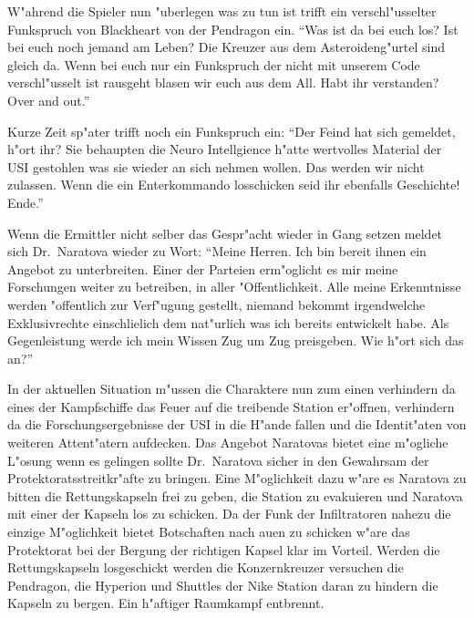 W"ahrend die Spieler nun "uberlegen was zu tun ist trifft ein verschl"usselter Funkspruch von Blackheart von der Pendragon ein. ``Was ist da bei euch los? Ist bei euch noch jemand am Leben? Die Kreuzer aus dem Asteroideng"urtel sind gleich da. Wenn bei euch nur ein Funkspruch der nicht mit unserem Code verschl"usselt ist rausgeht blasen wir euch aus dem All. Habt ihr verstanden? Over and out.''

Kurze Zeit sp"ater trifft noch ein Funkspruch ein: ``Der Feind hat sich gemeldet, h"ort ihr? Sie behaupten die Neuro Intellgience h"atte wertvolles Material der USI gestohlen was sie wieder an sich nehmen wollen. Das werden wir nicht zulassen. Wenn die ein Enterkommando losschicken seid ihr ebenfalls Geschichte! Ende.''

Wenn die Ermittler nicht selber das Gespr"acht wieder in Gang setzen meldet sich Dr.~Naratova wieder zu Wort: ``Meine Herren. Ich bin bereit ihnen ein Angebot zu unterbreiten. Einer der Parteien erm"oglicht es mir meine Forschungen weiter zu betreiben, in aller "Offentlichkeit. Alle meine Erkenntnisse werden "offentlich zur Verf"ugung gestellt, niemand bekommt irgendwelche Exklusivrechte einschlie\3lich dem nat"urlich was ich bereits entwickelt habe. Als Gegenleistung werde ich mein Wissen Zug um Zug preisgeben. Wie h"ort sich das an?''

In der aktuellen Situation m"ussen die Charaktere nun zum einen verhindern da\3 eines der Kampfschiffe das Feuer auf die treibende Station er"offnen, verhindern da\3 die Forschungsergebnisse der USI in die H"ande fallen und die Identit"aten von weiteren Attent"atern aufdecken. Das Angebot Naratovas bietet eine m"ogliche L"osung wenn es gelingen sollte Dr.~Naratova sicher in den Gewahrsam der Protektoratsstreitkr"afte zu bringen. Eine M"oglichkeit dazu w"are es Naratova zu bitten die Rettungskapseln frei zu geben, die Station zu evakuieren und Naratova mit einer der Kapseln los zu schicken. Da der Funk der Infiltratoren nahezu die einzige M"oglichkeit bietet Botschaften nach au\3en zu schicken w"are das Protektorat bei der Bergung der richtigen Kapsel klar im Vorteil. Werden die Rettungskapseln losgeschickt werden die Konzernkreuzer versuchen die Pendragon, die Hyperion und Shuttles der Nike Station daran zu hindern die Kapseln zu bergen. Ein h"aftiger Raumkampf entbrennt.

